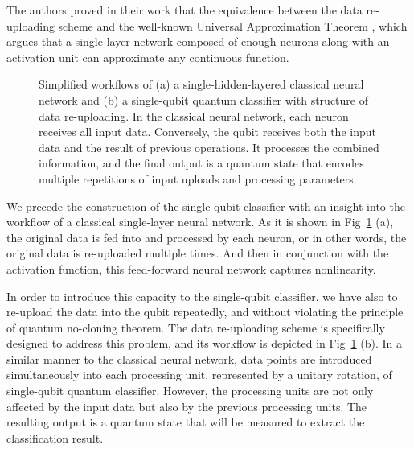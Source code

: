 The authors proved in their work that the equivalence between the data re-uploading scheme and the well-known Universal Approximation Theorem \cite{HORNIK1991251}, which argues that a single-layer network composed of enough neurons along with an activation unit can approximate any continuous function.

\begin{figure}[H]
\centering
{}
\caption{Simplified workflows of (a) a single-hidden-layered classical neural network and (b) a single-qubit quantum classifier with structure of data re-uploading.
In the classical neural network, each neuron receives all input data. Conversely, the qubit receives both the input data and the result of previous operations.  It processes the combined information, and the final output is a quantum state that encodes multiple repetitions of input uploads and processing parameters.}
\label{diagram_data_reuploading}
\end{figure}

We precede the construction of the single-qubit classifier with an insight into the workflow of a classical single-layer neural network.
As it is shown in Fig~\ref{diagram_data_reuploading} (a), the  original data is fed into and processed by each neuron, or in other words, the original data is re-uploaded multiple times. And then in conjunction with the activation function, this feed-forward neural network captures nonlinearity.

In order to introduce this capacity to the single-qubit classifier, we have also to re-upload the data into the qubit repeatedly, and without violating the principle of quantum no-cloning theorem. The data re-uploading scheme \cite{PerezSalinas2020datareuploading} is specifically designed to address this problem, and its workflow is depicted in Fig~\ref{diagram_data_reuploading} (b). In a similar manner to the classical neural network, data points are introduced simultaneously into each processing unit, represented by a unitary rotation, of single-qubit quantum classifier. 
However, the processing units are not only affected by the input data but also by the previous processing units.
The resulting output is a quantum state that will be measured to extract the classification result.

